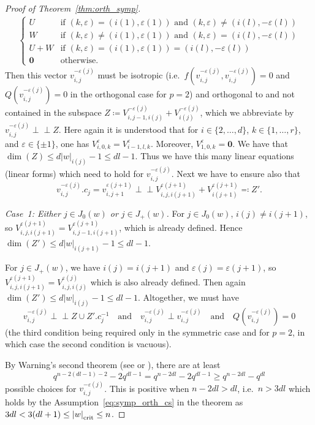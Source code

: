 \documentclass[a4paper,12pt]{amsproc}
\newcommand{\norm}[1]{\left\lvert#1\right\rvert}%
\newcommand{\perpnotin}{\mathrel{\perp\!\!\!\perp}}%
\theoremstyle{plain}
\theoremstyle{definition}
\begin{document}
\begin{proof}[Proof of Theorem~\ref{thm:orth_symp}]
\begin{align*}
\begin{cases}
U & \text{if }(k,\varepsilon)=(i(1),\varepsilon(1))\text{ and } (k,\varepsilon)\neq(i(l),-\varepsilon(l))\\
W & \text{if }(k,\varepsilon)\neq(i(1),\varepsilon(1))\text{ and } (k,\varepsilon)=(i(l),-\varepsilon(l))\\
U+W & \text{if }(k,\varepsilon)=(i(1),\varepsilon(1))=(i(l),-\varepsilon(l))\\
\mathbf{0} &\text{otherwise.}
\end{cases}
\end{align*}
Then this vector $v_{i,j}^{-\varepsilon(j)}$ must be isotropic (i.e.\ $f(v_{i,j}^{-\varepsilon(j)},v_{i,j}^{-\varepsilon(j)})=0$ and $Q(v_{i,j}^{-\varepsilon(j)})=0$ in the orthogonal case for $p=2$) and orthogonal to and not contained in the subspace $Z\coloneqq V_{i,j-1,i(j)}^{-\varepsilon(j)}+V_{i(j)}^{-\varepsilon(j)}$, which we abbreviate by $v_{i,j}^{-\varepsilon(j)}\perpnotin Z$. Here again it is understood that for $i\in\{2,\ldots,d\}$, $k\in\{1,\ldots,r\}$, and $\varepsilon\in\{\pm1\}$, one has $V_{i,0,k}^\varepsilon=V_{i-1,l,k}^\varepsilon$. Moreover, $V_{1,0,k}^\varepsilon=\mathbf{0}$. We have that $\dim(Z)\leq d\norm{w}_{i(j)}-1\leq dl-1$. Thus we have this many linear equations (linear forms) which need to hold for $v_{i,j}^{-\varepsilon(j)}$.
Next we have to ensure also that
$$
v_{i,j}^{-\varepsilon(j)}.c_j=v_{i,j+1}^{\varepsilon(j+1)}\perpnotin V_{i,j,i(j+1)}^{\varepsilon(j+1)}+V_{i(j+1)}^{\varepsilon(j+1)}\eqqcolon Z'.
$$
\vspace{3mm}
		
\noindent\emph{Case~1: Either $j\in J_0(w)$ or $j\in J_+(w)$.} For $j\in J_0(w)$, $i(j)\neq i(j+1)$, so $V_{i,j,i(j+1)}^{\varepsilon(j+1)}=V_{i,j-1,i(j+1)}^{\varepsilon(j+1)}$, which is already defined. Hence $\dim(Z')\leq d\norm{w}_{i(j+1)}-1\leq dl-1$.
		
For $j\in J_+(w)$, we have $i(j)=i(j+1)$ and $\varepsilon(j)=\varepsilon(j+1)$, so $V_{i,j,i(j+1)}^{\varepsilon(j+1)}=V_{i,j,i(j)}^{\varepsilon(j)}$ which is also already defined. Then again $\dim(Z')\leq d\norm{w}_{i(j)}-1\leq dl-1$.
Altogether, we must have
$$
v_{i,j}^{-\varepsilon(j)}\perpnotin Z\cup Z'.c_j^{-1}\quad\text{and}\quad v_{i,j}^{-\varepsilon(j)}\perp v_{i,j}^{-\varepsilon(j)} 
\quad\text{and}\quad Q(v_{i,j}^{-\varepsilon(j)}) = 0
$$
(the third condition being required only in the symmetric case and for $p=2$, 
in which case the second condition is vacuous).

By Warning's second theorem (see \cite{warning} or \cite{asgarli2018new}), 
there are at least 
$$
q^{n-2(dl-1)-2}-2q^{dl-1}=q^{n-2dl}-2q^{dl-1}\geq q^{n-2dl}-q^{dl}
$$
possible choices for $v_{i,j}^{-\varepsilon(j)}$. This is positive when $n-2dl>dl$, i.e.\ $n>3dl$ which holds by the Assumption~\eqref{eq:symp_orth_cs} in the theorem as $3dl<3(dl+1)\leq\norm{w}_{\rm crit}\leq n$.
		

\end{proof}
\end{document}
